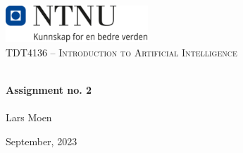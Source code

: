 \begin{titlepage}
\vbox{ }
\vbox{ }
\begin{center}
\includegraphics[width=0.40\textwidth]{Images/NTNU_logo.png}\\[1cm]
\textsc{\Large TDT4136 – Introduction to Artificial Intelligence}\\[0.5cm]
\vbox{ }

\HRule \\[0.4cm]
{ \huge \bfseries Assignment no. 2}\\[0.4cm]
\HRule \\[1.5cm]

\large
Lars Moen
\vfill

{\large September, 2023}
\end{center}
\end{titlepage}